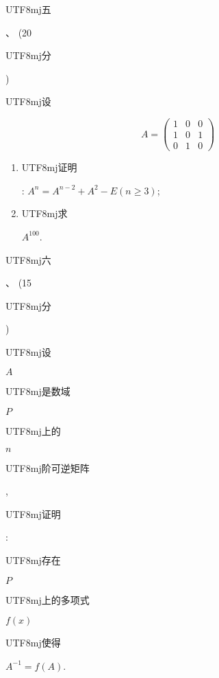 \documentclass[10pt]{article}
\begin{document}
\begin{CJK}{UTF8}{mj}五\end{CJK}、 (20 \begin{CJK}{UTF8}{mj}分\end{CJK}) \begin{CJK}{UTF8}{mj}设\end{CJK}
$$
A=\left(\begin{array}{lll}
1 & 0 & 0 \\
1 & 0 & 1 \\
0 & 1 & 0
\end{array}\right)
$$

\begin{enumerate}
  \item \begin{CJK}{UTF8}{mj}证明\end{CJK}: $A^{n}=A^{n-2}+A^{2}-E(n \geqslant 3)$;

  \item \begin{CJK}{UTF8}{mj}求\end{CJK} $A^{100}$.

\end{enumerate}
\begin{CJK}{UTF8}{mj}六\end{CJK}、 (15 \begin{CJK}{UTF8}{mj}分\end{CJK}) \begin{CJK}{UTF8}{mj}设\end{CJK} $A$ \begin{CJK}{UTF8}{mj}是数域\end{CJK} $P$ \begin{CJK}{UTF8}{mj}上的\end{CJK} $n$ \begin{CJK}{UTF8}{mj}阶可逆矩阵\end{CJK}, \begin{CJK}{UTF8}{mj}证明\end{CJK}: \begin{CJK}{UTF8}{mj}存在\end{CJK} $P$ \begin{CJK}{UTF8}{mj}上的多项式\end{CJK} $f(x)$ \begin{CJK}{UTF8}{mj}使得\end{CJK} $A^{-1}=f(A)$.
\end{document}
